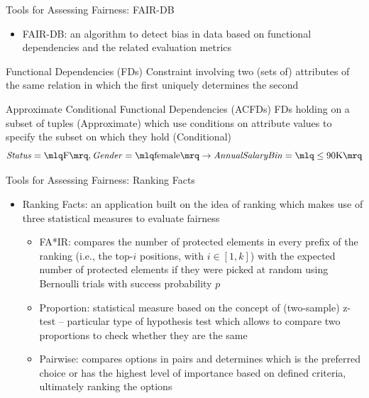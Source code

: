 \documentclass[usenames,dvipsnames]{beamer}
\begin{document}
    
    \begin{frame}{Tools for Assessing Fairness: FAIR-DB}
        \begin{itemize}
            \item \alert{FAIR-DB}: an algorithm to detect bias in data based on \textcolor{defaultBlue}{functional dependencies} and the related evaluation metrics \emph{\parencite{azzalini2021fair}}
        \end{itemize}
        \begin{block}{Functional Dependencies (FDs)}
            Constraint involving two (sets of) attributes of the same relation in which the first {uniquely determines} the second
        \end{block}
        \begin{block}{Approximate Conditional Functional Dependencies (ACFDs)}
            FDs holding on a subset of tuples (Approximate) which use conditions on attribute values to specify the subset on which they hold (Conditional)
            \[\mathit{Status} = \mlq \mathrm{F} \mrq, \mathit{Gender} = \mlq \mathrm{female} \mrq \rightarrow \mathit{Annual Salary Bin} = \mlq \leq \mathrm{90K} \mrq\]
        \end{block}
    \end{frame}
    
    
    \begin{frame}{Tools for Assessing Fairness: Ranking Facts}
        \begin{itemize}
            \item \alert{Ranking Facts}: an application built on the idea of \textcolor{defaultBlue}{ranking} which makes use of three statistical measures to evaluate fairness \emph{\parencite{yang2018nutritional}}
            \begin{itemize}
                \item \textcolor{defaultBlue}{FA*IR}: compares the number of protected elements in every prefix of the ranking (i.e., the top-\(i\) positions, with \(i \in [1, k]\)) with the expected number of protected elements if they were picked at random using Bernoulli trials with success probability \(p\)
                \item \textcolor{defaultBlue}{Proportion}: statistical measure based on the concept of {(two-sample) z-test} -- particular type of hypothesis test which allows to compare two proportions to check whether they are the same
                \item \textcolor{defaultBlue}{Pairwise}: compares options in pairs and determines which is the preferred choice or has the highest level of importance based on defined criteria, ultimately ranking the options
            \end{itemize}
        \end{itemize}
    \end{frame}
    
\end{document}
